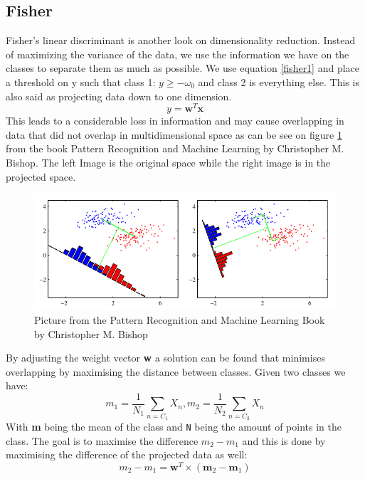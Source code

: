 \subsection{Fisher}
Fisher's linear discriminant is another look on dimensionality reduction. Instead of maximizing the variance of the data, we use the information we have on the classes to separate them as much as possible. We use equation \ref{fisher1} and place a threshold on y such that class 1: $y\geqslant -\omega_0$ and class 2 is everything else. This is also said as projecting data down to one dimension.
\begin{equation}
\label{fisher1}
y = \textbf{w}^T\textbf{x}
\end{equation}
This leads to a considerable loss in information and may cause overlapping in data that did not overlap in multidimensional space as can be see on figure \ref{fig:fisher} from the book Pattern Recognition and Machine Learning by Christopher M. Bishop\cite{bishop2006pattern}. The left Image is  the original space while the right image is in the projected space.\\
\begin{figure}
\centering
\includegraphics[width=1\textwidth]{images/fisher}
\caption{Picture from the Pattern Recognition and Machine Learning Book by Christopher M. Bishop}
\label{fig:fisher}
\end{figure}
By adjusting the weight vector \textbf{w} a solution can be found that minimises overlapping by maximising the distance between classes. Given two classes we have:
\begin{equation}
m_1 = \frac{1}{N_1} \sum_{n=C_1} X_n,       m_2 = \frac{1}{N_2} \sum_{n=C_2} X_n
\end{equation}
With \textbf{m} being the mean of the class and \texttt{N} being the amount of points in the class. The goal is to maximise the difference $m_2 - m_1$ and this is done by maximising the difference of the projected data as well:
\begin{equation}
m_2 - m_1 = \textbf{w}^{T} \times ( \textbf{m}_2 - \textbf{m}_1 )
\end{equation}
